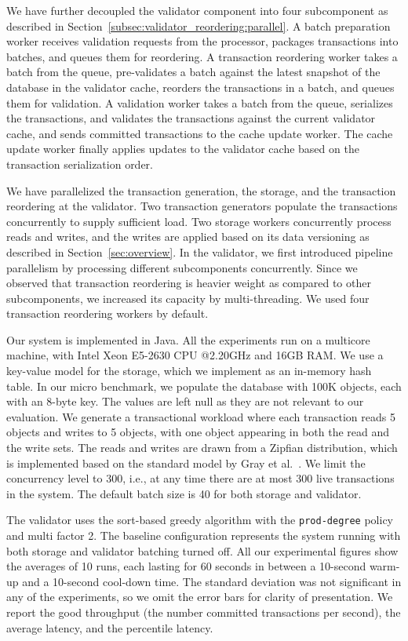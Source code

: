We have further decoupled the validator component into four subcomponent as described in Section~\ref{subsec:validator_reordering:parallel}. A batch preparation worker receives validation requests from the processor, packages transactions into batches, and queues them for reordering. A transaction reordering worker takes a batch from the queue, pre-validates a batch against the latest snapshot of the database in the validator cache, reorders the transactions in a batch, and queues them for validation. A validation worker takes a batch from the queue, serializes the transactions, and validates the transactions against the current validator cache, and sends committed transactions to the cache update worker. The cache update worker finally applies updates to the validator cache based on the transaction serialization order. 

We have parallelized the transaction generation, the storage, and the transaction reordering at the validator. Two transaction generators populate the transactions concurrently to supply sufficient load. Two storage workers concurrently process reads and writes, and the writes are applied based on its data versioning as described in Section~\ref{sec:overview}. In the validator, we first introduced pipeline parallelism by processing different subcomponents concurrently. Since we observed that transaction reordering is heavier weight as compared to other subcomponents, we increased its capacity by multi-threading. We used four transaction reordering workers by default.


Our system is implemented in Java. All the experiments run on a multicore machine, with Intel Xeon E5-2630 CPU @2.20GHz and 16GB RAM. We use a key-value model for the storage, which we implement as an in-memory hash table. In our micro benchmark, we populate the database with 100K objects, each with an 8-byte key. The values are left null as they are not relevant to our evaluation. We generate a transactional workload where each transaction reads 5 objects and writes to 5 objects, with one object appearing in both the read and the write sets. The reads and writes are drawn from a Zipfian distribution, which is implemented based on the standard model by Gray et al.~\cite{gray1994quickly}. We limit the concurrency level to 300, i.e., at any time there are at most 300 live transactions in the system. The default batch size is 40 for both storage and validator.

The validator uses the sort-based greedy algorithm with the \texttt{prod-degree} policy and multi factor 2. The baseline configuration represents the system running with both storage and validator batching turned off.  All our experimental figures show the averages of 10 runs, each lasting for 60 seconds in between a 10-second warm-up and a 10-second cool-down time. The standard deviation was not significant in any of the experiments, so we omit the error bars for clarity of presentation. We report the good throughput (the number committed transactions per second), the average latency, and the percentile latency.


